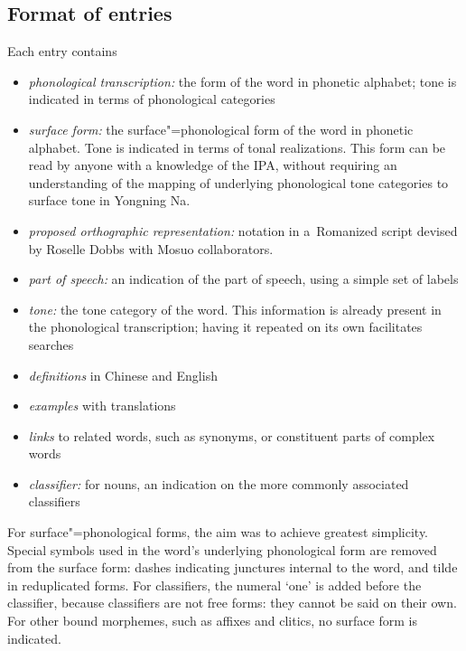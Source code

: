 	\subsection{Format of entries} \label{sec:entries}

Each entry contains
\begin{itemize}
	\item \textit{phonological transcription:} the form of the word in phonetic alphabet; tone is indicated in terms of phonological categories
	\item \textit{surface form:} the surface"=phonological form of the word in phonetic alphabet. Tone is indicated in terms of tonal realizations. This form can be read by anyone with a knowledge of the IPA, without requiring an understanding of the mapping of underlying phonological tone categories to surface tone in Yongning Na. 
	\item \textit{proposed orthographic representation:} notation in a~Romanized script devised by Roselle Dobbs with Mosuo collaborators. 
	\item \textit{part of speech:} an indication of the part of speech, using a simple set of labels
	\item \textit{tone:} the tone category of the word. This information is already present in the phonological transcription; having it repeated on its own facilitates searches
	\item \textit{definitions} in Chinese and English
	\item \textit{examples} with translations
	\item \textit{links} to related words, such as synonyms, or constituent parts of complex words 
	\item \textit{classifier:} for nouns, an indication on the more commonly associated classifiers
\end{itemize}

For surface"=phonological forms, the aim was to achieve greatest simplicity. Special symbols used in the word's underlying phonological form are removed from the surface form: dashes indicating junctures internal to the word, and tilde in reduplicated forms. For classifiers, the numeral ‘one' is added before the classifier, because classifiers are not free forms: they cannot be said on their own. For other bound morphemes, such as affixes and clitics, no surface form is indicated.

